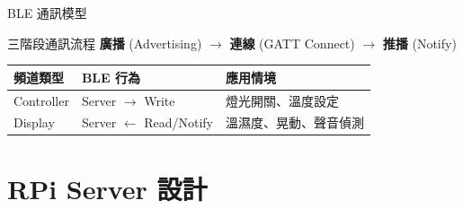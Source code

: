 \documentclass[10pt,aspectratio=169]{beamer}
\begin{document}
\begin{frame}{BLE 通訊模型}
  \begin{block}{三階段通訊流程}
    \textbf{廣播} (Advertising) $\to$
    \textbf{連線} (GATT Connect) $\to$
    \textbf{推播} (Notify)
  \end{block}

  \vspace{0.5em}
  \begin{table}
    \centering
    \small
    \begin{tabular}{@{}lll@{}}
      \toprule
      \textbf{頻道類型} & \textbf{BLE 行為} & \textbf{應用情境} \\
      \midrule
      Controller & Server $\to$ Write   & 燈光開關、溫度設定 \\
      Display    & Server $\leftarrow$ Read/Notify & 溫濕度、晃動、聲音偵測 \\
      \bottomrule
    \end{tabular}
  \end{table}
\end{frame}

\section{RPi Server 設計}
\end{document}
